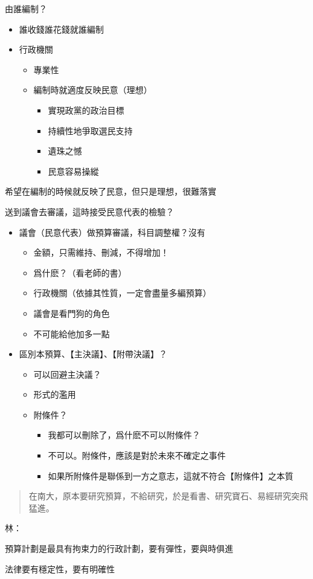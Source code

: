 \documentclass[]{book}
\providecommand{\tightlist}{%
  \setlength{\itemsep}{0pt}\setlength{\parskip}{0pt}}
\begin{document}
由誰編制？

\begin{itemize}
\tightlist
\item
  誰收錢誰花錢就誰編制
\item
  行政機關

  \begin{itemize}
  \tightlist
  \item
    專業性
  \item
    編制時就適度反映民意（理想）

    \begin{itemize}
    \tightlist
    \item
      實現政黨的政治目標
    \item
      持續性地爭取選民支持
    \item
      遺珠之憾
    \item
      民意容易操縱
    \end{itemize}
  \end{itemize}
\end{itemize}

希望在編制的時候就反映了民意，但只是理想，很難落實

送到議會去審議，這時接受民意代表的檢驗？

\begin{itemize}
\tightlist
\item
  議會（民意代表）做預算審議，科目調整權？沒有

  \begin{itemize}
  \tightlist
  \item
    金額，只需維持、刪減，不得增加！
  \item
    爲什麽？（看老師的書）
  \item
    行政機關（依據其性質，一定會盡量多編預算）
  \item
    議會是看門狗的角色
  \item
    不可能給他加多一點
  \end{itemize}
\item
  區別本預算、【主決議】、【附帶決議】？

  \begin{itemize}
  \tightlist
  \item
    可以回避主決議？
  \item
    形式的濫用
  \item
    附條件？

    \begin{itemize}
    \tightlist
    \item
      我都可以刪除了，爲什麽不可以附條件？
    \item
      不可以。附條件，應該是對於未來不確定之事件
    \item
      如果所附條件是聯係到一方之意志，這就不符合【附條件】之本質
    \end{itemize}
  \end{itemize}
\end{itemize}

\begin{quote}
在南大，原本要研究預算，不給研究，於是看書、研究寶石、易經研究突飛猛進。
\end{quote}

林：

預算計劃是最具有拘束力的行政計劃，要有彈性，要與時俱進

法律要有穩定性，要有明確性

\backmatter
\printindex
\end{document}
